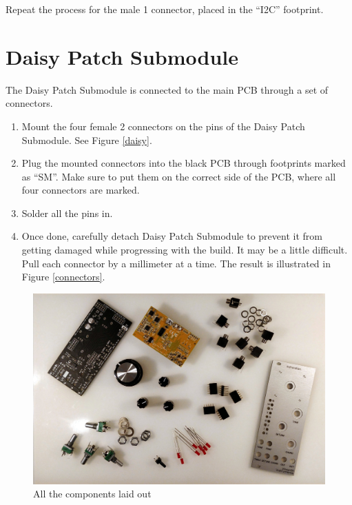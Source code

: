 \documentclass[10pt,a4paper,twocolumn]{article}
\begin{document}
Repeat the process for the male 1 connector, placed in the ``I2C''
footprint.

\section{Daisy Patch Submodule}

The Daisy Patch Submodule is connected to the main PCB through a set of
connectors.

\begin{enumerate}
  \item Mount the four female 2 connectors on the pins of the Daisy
    Patch Submodule. See Figure \ref{daisy}.
  \item Plug the mounted connectors into the black PCB through
    footprints marked as ``SM''. Make sure to put them on the correct side
    of the PCB, where all four connectors are marked.
  \item Solder all the pins in.
  \item Once done, carefully detach Daisy Patch Submodule to prevent it
    from getting damaged while progressing with the build. It may be a
    little difficult. Pull each connector by a millimeter at a time.
    The result is illustrated in Figure \ref{connectors}.
\end{enumerate}

\begin{figure}[h]
  \centering
  \includegraphics[width=\linewidth]{p01.jpg}
  \caption{All the components laid out}
\end{figure}
\end{document}
